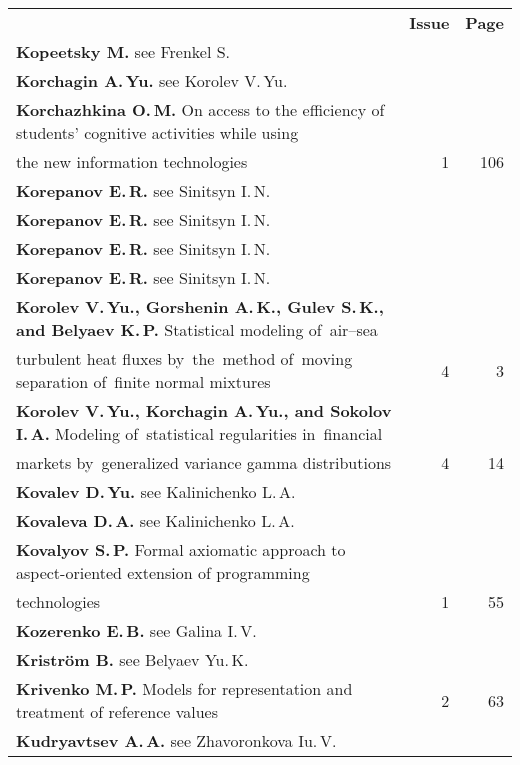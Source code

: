 {\tabcolsep=3pt
\begin{tabular}{p{397pt}rr}
&\textbf{Issue} & \textbf{Page}\\[6pt]
\textbf{Kopeetsky M.} see Frenkel S.&&\\
\textbf{Korchagin A.\,Yu.} see Korolev V.\,Yu.&&\\
\textbf{Korchazhkina O.\,M.} On access to the efficiency of students' cognitive
activities while using\linebreak
\\[-12pt]
\hspace*{21pt}the new information technologies&1&106\\
\textbf{Korepanov E.\,R.} see Sinitsyn I.\,N.&&\\
\textbf{Korepanov E.\,R.} see Sinitsyn I.\,N.&&\\
\textbf{Korepanov E.\,R.} see Sinitsyn I.\,N.&&\\
\textbf{Korepanov E.\,R.} see Sinitsyn I.\,N.&&\\
\textbf{Korolev V.\,Yu., Gorshenin A.\,K., Gulev S.\,K., and Belyaev K.\,P.}
Statistical modeling of~air--sea\linebreak
\\[-12pt]
\hspace*{21pt}turbulent heat fluxes by~the~method of~moving separation
of~finite normal mixtures&4&3\\
\textbf{Korolev V.\,Yu., Korchagin A.\,Yu., and Sokolov I.\,A.} Modeling of~statistical
regularities in~financial\linebreak
\\[-12pt]
\hspace*{21pt}markets by~generalized variance gamma distributions&4&14\\
\textbf{Kovalev D.\,Yu.} see Kalinichenko L.\,A.&&\\
\textbf{Kovaleva D.\,A.} see Kalinichenko L.\,A.&&\\
\textbf{Kovalyov S.\,P.} Formal axiomatic approach to aspect-oriented
extension of programming\linebreak
\\[-12pt]
\hspace*{21pt}technologies&1&55\\
\textbf{Kozerenko E.\,B.} see Galina I.\,V.&&\\
\textbf{Kristr\"{o}m B.} see Belyaev Yu.\,K.&&\\
\textbf{Krivenko M.\,P.} Models for representation and treatment of reference
values&2&63\\
\textbf{Kudryavtsev A.\,A.} see Zhavoronkova Iu.\,V.&&\\

\end{tabular}}
